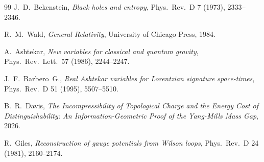 \documentclass[12pt]{amsart}
\theoremstyle{definition}
\begin{document}
\begin{thebibliography}{99}
 J.~D.~Bekenstein, \emph{Black holes and entropy}, Phys.\ Rev.\ D 7 (1973), 2333--2346.

 R.~M.~Wald, \emph{General Relativity}, University of Chicago Press, 1984.

 A.~Ashtekar, \emph{New variables for classical and quantum gravity}, Phys.\ Rev.\ Lett.\ 57 (1986), 2244--2247.

 J.~F.~Barbero~G., \emph{Real Ashtekar variables for Lorentzian signature space-times}, Phys.\ Rev.\ D 51 (1995), 5507--5510.

 B.~R.~Davis, \emph{The Incompressibility of Topological Charge and the Energy Cost of Distinguishability: An Information-Geometric Proof of the Yang-Mills Mass Gap}, 2026.

 R.~Giles, \emph{Reconstruction of gauge potentials from Wilson loops}, Phys.\ Rev.\ D 24 (1981), 2160--2174.
\end{thebibliography}
\end{document}
